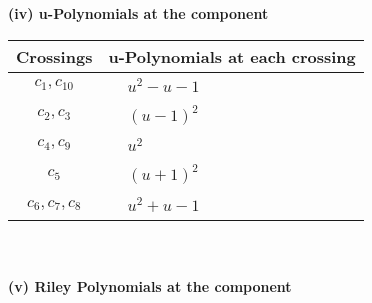 \documentclass[1p]{elsarticle_modified}
\theoremstyle{definition}
\begin{document}
\newpage\renewcommand{\arraystretch}{1}
\flushleft \textbf{(iv) u-Polynomials at the component}\newline \\
\begin{tabular}{m{50pt}|m{274pt}}
Crossings & \hspace{64pt}u-Polynomials at each crossing \\
\hline $$\begin{aligned}c_{1},c_{10}\end{aligned}$$&$\begin{aligned}
&u^2- u-1
\end{aligned}$\\
\hline $$\begin{aligned}c_{2},c_{3}\end{aligned}$$&$\begin{aligned}
&(u-1)^2
\end{aligned}$\\
\hline $$\begin{aligned}c_{4},c_{9}\end{aligned}$$&$\begin{aligned}
&u^2
\end{aligned}$\\
\hline $$\begin{aligned}c_{5}\end{aligned}$$&$\begin{aligned}
&(u+1)^2
\end{aligned}$\\
\hline $$\begin{aligned}c_{6},c_{7},c_{8}\end{aligned}$$&$\begin{aligned}
&u^2+u-1
\end{aligned}$\\
\hline
\end{tabular}\\~\\
\newpage\renewcommand{\arraystretch}{1}
\flushleft \textbf{(v) Riley Polynomials at the component}\newline \\
\end{document}
